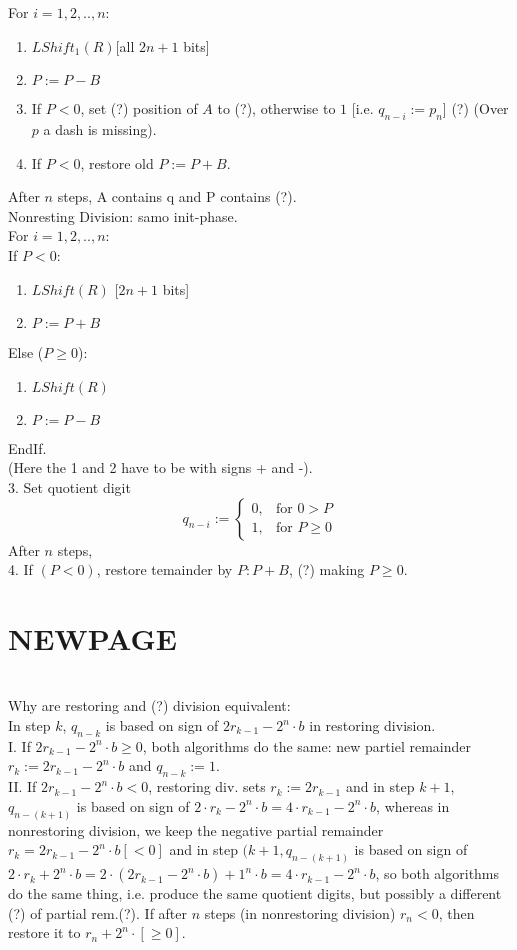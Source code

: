 For $i=1,2,..,n:$ \\
\begin{enumerate}
    \item $LShift_1(R) $[all $2n+1$ bits]
    \item $P:=P-B$
    \item If $P<0$, set (?) position of $A$ to (?), otherwise to $1$ [i.e. $q_{n-i}:=p_n$] (?) (Over $p$ a dash is missing).
    \item If $P<0$, restore old $P:=P+B$.
\end{enumerate}
After $n$ steps, A contains q and P contains (?). \\

Nonresting Division: samo init-phase. \\
For $i=1,2,..,n:$ \\
If $P<0$:
\begin{enumerate}
    \item $LShift(R)$ [$2n+1$ bits]
    \item $P:=P+B$
\end{enumerate}
Else ($P\ge 0$):
\begin{enumerate}
    \item $LShift(R)$
    \item $P:=P-B$
\end{enumerate}
EndIf.\\
(Here the 1 and 2 have to be with signs + and -).\\

3. Set quotient digit
$$
q_{n-i}:=
\begin{cases}
0, & \text{for } 0>P\\
1,  & \text{for } P\ge 0
\end{cases}
$$
After $n$ steps, \\
4. If $(P<0)$, restore temainder by $P:P+B$, (?) making $P\ge 0$. \bigskip

\section*{NEWPAGE} \\

Why are restoring and (?) division equivalent: \\
In step $k$, $q_{n-k}$ is based on sign of $2r_{k-1}-2^n\cdot b$ in restoring division. \\
I. If $2r_{k-1}-2^n\cdot b \ge 0$, both algorithms do the same: new partiel remainder $r_k:=2r_{k-1}-2^n\cdot b$ and $q_{n-k}:=1$. \\
II. If $2r_{k-1}-2^n\cdot b < 0$, restoring div. sets $r_k:=2r_{k-1}$ and in step $k+1$, $q_{n-(k+1)}$ is based on sign of $2\cdot r_k-2^n\cdot b=4\cdot r_{k-1}-2^n\cdot b$, whereas in nonrestoring division, we keep the negative partial remainder $r_k=2r_{k-1}-2^n\cdot b[<0]$ and in step $(k+1, q_{n-(k+1)}$ is based on sign of $2\cdot r_k+2^n\cdot b=2\cdot (2r_{k-1}-2^n\cdot b)+1^n\cdot b=4\cdot r_{k-1}-2^n\cdot b$, so both algorithms do the same thing, i.e. produce the same quotient digits, but possibly a different (?) of partial rem.(?). If after $n$ steps (in nonrestoring division) $r_n<0$, then restore it to $r_n+2^n\cdot [\ge 0]$. \\

